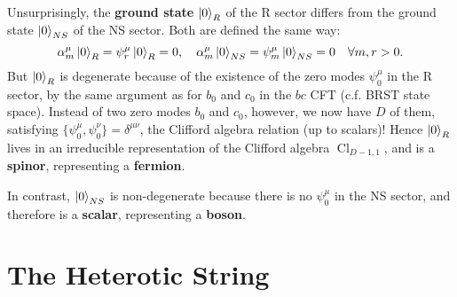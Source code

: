\documentclass{report}
\theoremstyle{plain}
\theoremstyle{definition}
\theoremstyle{remark}
\DeclareMathOperator{\Cl}{Cl}
\begin{document}
Unsurprisingly, the {\bf ground state} $\ket{0}_R$ of the R sector
differs from the ground state $\ket{0}_{NS}$ of the NS sector. Both
are defined the same way:
\[ \alpha^\mu_m \ket{0}_R = \psi^\mu_r \ket{0}_R = 0, \quad \alpha^\mu_m \ket{0}_{NS} = \psi^\mu_m \ket{0}_{NS} = 0 \quad \forall m, r > 0. \]
But $\ket{0}_R$ is degenerate because of the existence of the zero
modes $\psi^\mu_0$ in the R sector, by the same argument as for $b_0$
and $c_0$ in the $bc$ CFT (c.f. BRST state space). Instead of two zero
modes $b_0$ and $c_0$, however, we now have $D$ of them, satisfying
$\{\psi^\mu_0, \psi^\nu_0\} = \delta^{\mu\nu}$, the Clifford algebra
relation (up to scalars)! Hence $\ket{0}_R$ lives in an irreducible
representation of the Clifford algebra $\Cl_{D-1,1}$, and is a {\bf
  spinor}, representing a {\bf fermion}.

In contrast, $\ket{0}_{NS}$ is non-degenerate because there is no
$\psi^\mu_0$ in the NS sector, and therefore is a {\bf scalar},
representing a {\bf boson}.

\section{The Heterotic String}
\end{document}
